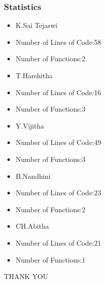 \documentclass[12pt]{beamer}
\begin{document}
    \begin{frame}
	\frametitle{Statistics}
        \begin{itemize}
        \item K.Sai Tejaswi\\
	     \item Number of Lines of Code:58\\
	     \item Number of Functions:2\\
	     \item T.Harshitha\\
	     \item Number of Lines of Code:16\\
	     \item Number of Functions:3\\
	     \item Y.Vijitha\\
	     \item Number of Lines of Code:49\\
	     \item Number of Functions:3\\
	     \item B.Nandhini\\
	     \item Number of Lines of Code:23\\
	     \item Number of Functions:2\\
	     \item CH.Abitha\\
	     \item Number of Lines of Code:21\\
	     \item Number of Functions:1\\
	     
	     
        \end{itemize}
    \end{frame}
    \begin{frame}
	\begin{center}
	      THANK YOU
	\end{center}
    \end{frame}
\end{document}
